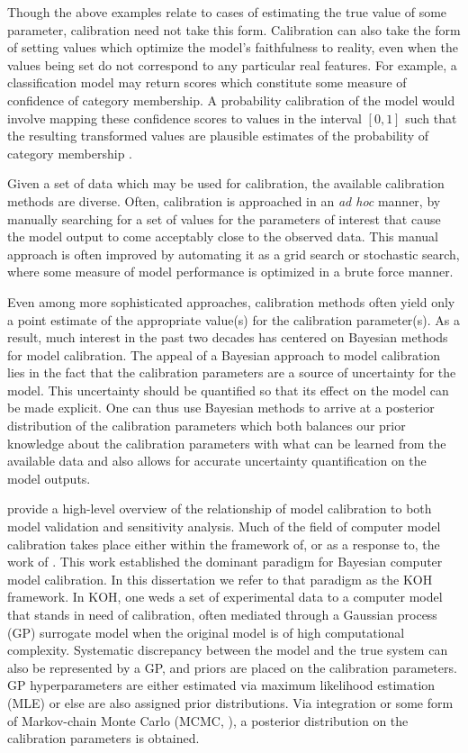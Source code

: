 \documentclass[12pt]{article}
\begin{document}
Though the above examples relate to cases of estimating the true value of some parameter, calibration need not take this form.
Calibration can also take the form of setting values which optimize the model's faithfulness to reality, even when the values being set do not correspond to any particular real features.
For example, a classification model may return scores which constitute some measure of confidence of category membership.
A probability calibration of the model would involve mapping these confidence scores to values in the interval $[0,1]$ such that the resulting transformed values are plausible estimates of the probability of category membership \citep{Niculescu2005}.

Given a set of data which may be used for calibration, the available calibration methods are diverse. 
Often, calibration is approached in an \textit{ad hoc} manner, by manually searching for a set of values for the parameters of interest that cause the model output to come acceptably close to the observed data.
This manual approach is often improved by automating it as a grid search or stochastic search, where some measure of model performance is optimized in a brute force manner.

Even among more sophisticated approaches, calibration methods often yield only a point estimate of the appropriate value(s) for the calibration parameter(s).
As a result, much interest in the past two decades has centered on Bayesian methods for model calibration. 
The appeal of a Bayesian approach to model calibration lies in the fact that the calibration parameters are a source of uncertainty for the model. 
This uncertainty should be quantified so that its effect on the model can be made explicit. 
One can thus use Bayesian methods to arrive at a posterior distribution of the calibration parameters which both balances our prior knowledge about the calibration parameters with what can be learned from the available data and also allows for accurate uncertainty quantification on the model outputs. 


\citet{Trucano2006} provide a high-level overview of the relationship of model calibration to both model validation and sensitivity analysis.
Much of the field of computer model calibration takes place either within the framework of, or as a response to, the work of \citet{Kennedy2001}.
This work established the dominant paradigm for Bayesian computer model calibration.
In this dissertation we refer to that paradigm as the KOH framework.
In KOH, one weds a set of experimental data to a computer model that stands in need of calibration, often mediated through a Gaussian process (GP) surrogate model when the original model is of high computational complexity.
Systematic discrepancy between the model and the true system can also be represented by a GP, and priors are placed on the calibration parameters.
GP hyperparameters are either estimated via maximum likelihood estimation (MLE) or else are also assigned prior distributions.
Via integration or some form of Markov-chain Monte Carlo (MCMC, \cite{Gelfand1990}), a posterior distribution on the calibration parameters is obtained.
\end{document}
